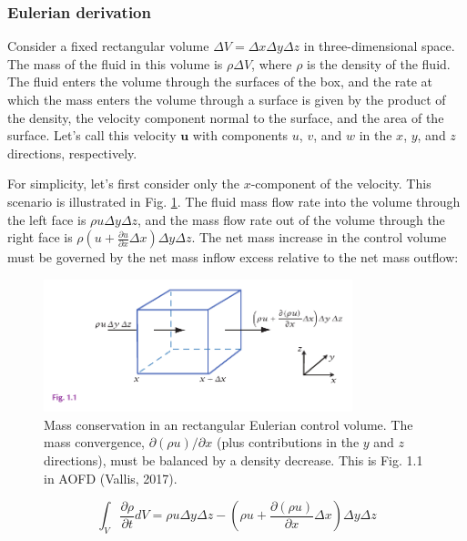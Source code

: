 \documentclass[12pt]{article}
\numberwithin{equation}{section}
\numberwithin{figure}{section}
\numberwithin{table}{section}
\begin{document}
\subsubsection{Eulerian derivation}

Consider a fixed rectangular volume $\Delta V = \Delta x \Delta y \Delta z$ in
three-dimensional space.
The mass of the fluid in this volume is $\rho \Delta V$, where $\rho$ is the
density of the fluid.
The fluid enters the volume through the surfaces of the box, and the rate at
which the mass enters the volume through a surface is given by the product of
the density, the velocity component normal to the surface, and the area of the
surface.
Let's call this velocity $\mathbf{u}$ with components $u$, $v$, and $w$ in the
$x$, $y$, and $z$ directions, respectively.

For simplicity, let's first consider only the $x$-component of the velocity.
This scenario is illustrated in Fig. \ref{fig:continuity1}.
The fluid mass flow rate into the volume through the left face is $\rho u \Delta y \Delta z$,
and the mass flow rate out of the volume through the right face is
$\rho (u + \frac{\partial u}{\partial x} \Delta x) \Delta y \Delta z$.
The net mass increase in the control volume must be governed by the net mass
inflow excess relative to the net mass outflow:

\begin{figure}[h]
  \centering
  \includegraphics[width=0.8\textwidth]{assets/fig_continuity1.pdf}
  \caption{
    Mass conservation in an rectangular Eulerian control volume.
    The mass convergence, $\partial(\rho u)/\partial x$
    (plus contributions in the $y$ and $z$ directions),
    must be balanced by a density decrease.
    This is Fig. 1.1 in AOFD (Vallis, 2017).
  }
  \label{fig:continuity1}
\end{figure}

\begin{equation}
  \int_V \frac{\partial \rho}{\partial t} dV =
  \rho u \Delta y \Delta z - \left(\rho u + \frac{\partial (\rho u)}{\partial x} \Delta x\right) \Delta y \Delta z
\end{equation}
\end{document}
